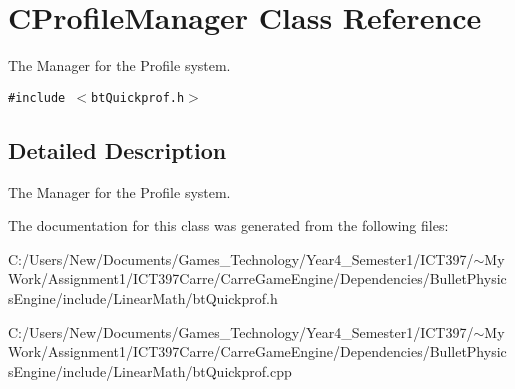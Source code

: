 \hypertarget{class_c_profile_manager}{
\section{CProfileManager Class Reference}
\label{class_c_profile_manager}
}
The Manager for the Profile system.  


{\tt \#include $<$btQuickprof.h$>$}



\subsection{Detailed Description}
The Manager for the Profile system. 

The documentation for this class was generated from the following files:\begin{CompactItemize}
\item 
C:/Users/New/Documents/Games\_\-Technology/Year4\_\-Semester1/ICT397/$\sim$My Work/Assignment1/ICT397Carre/CarreGameEngine/Dependencies/BulletPhysicsEngine/include/LinearMath/btQuickprof.h\item 
C:/Users/New/Documents/Games\_\-Technology/Year4\_\-Semester1/ICT397/$\sim$My Work/Assignment1/ICT397Carre/CarreGameEngine/Dependencies/BulletPhysicsEngine/include/LinearMath/btQuickprof.cpp\end{CompactItemize}
